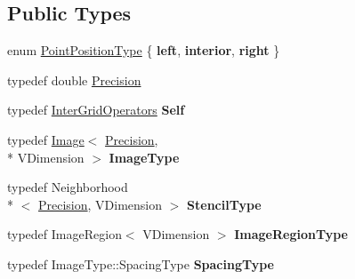 \subsection*{Public Types}
\begin{DoxyCompactItemize}
\item 
enum \hyperlink{classitk_1_1mad_1_1_inter_grid_operators_a7dfcf280f70ae36e4860d8d962f4a05d}{Point\-Position\-Type} \{ {\bfseries left}, 
{\bfseries interior}, 
{\bfseries right}
 \}
\item 
typedef double \hyperlink{classitk_1_1mad_1_1_inter_grid_operators_ade61ab9b171ac4b689489cb14d3bde7d}{Precision}
\item 
\hypertarget{classitk_1_1mad_1_1_inter_grid_operators_a55328ff18ed00cabde49d578ce4cec2d}{typedef \hyperlink{classitk_1_1mad_1_1_inter_grid_operators}{Inter\-Grid\-Operators} {\bfseries Self}}\label{classitk_1_1mad_1_1_inter_grid_operators_a55328ff18ed00cabde49d578ce4cec2d}

\item 
\hypertarget{classitk_1_1mad_1_1_inter_grid_operators_a6d5bdce33c32c798359046b3baa4658d}{typedef \hyperlink{class_image}{Image}$<$ \hyperlink{classitk_1_1mad_1_1_inter_grid_operators_ade61ab9b171ac4b689489cb14d3bde7d}{Precision}, \\*
V\-Dimension $>$ {\bfseries Image\-Type}}\label{classitk_1_1mad_1_1_inter_grid_operators_a6d5bdce33c32c798359046b3baa4658d}

\item 
\hypertarget{classitk_1_1mad_1_1_inter_grid_operators_ac0d30ff94e6b2d266ebbccb1994e3eb5}{typedef Neighborhood\\*
$<$ \hyperlink{classitk_1_1mad_1_1_inter_grid_operators_ade61ab9b171ac4b689489cb14d3bde7d}{Precision}, V\-Dimension $>$ {\bfseries Stencil\-Type}}\label{classitk_1_1mad_1_1_inter_grid_operators_ac0d30ff94e6b2d266ebbccb1994e3eb5}

\item 
\hypertarget{classitk_1_1mad_1_1_inter_grid_operators_a7221885e733f0b64c02f1975517e8e51}{typedef Image\-Region$<$ V\-Dimension $>$ {\bfseries Image\-Region\-Type}}\label{classitk_1_1mad_1_1_inter_grid_operators_a7221885e733f0b64c02f1975517e8e51}

\item 
\hypertarget{classitk_1_1mad_1_1_inter_grid_operators_a9fce7d83a2d10d6c06db2e36dc6e1eca}{typedef Image\-Type\-::\-Spacing\-Type {\bfseries Spacing\-Type}}\label{classitk_1_1mad_1_1_inter_grid_operators_a9fce7d83a2d10d6c06db2e36dc6e1eca}


\end{DoxyCompactItemize}
